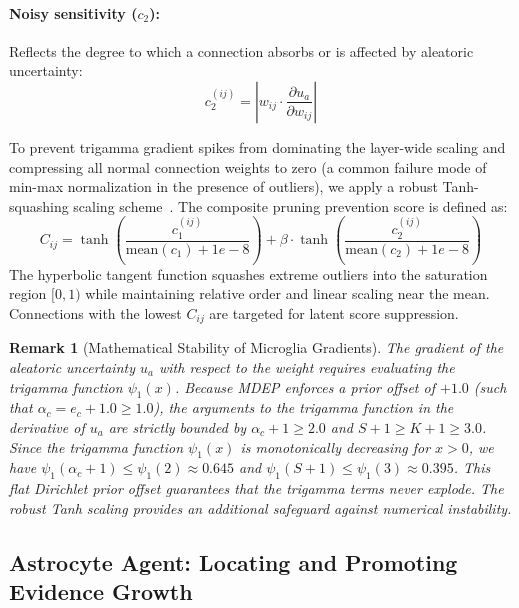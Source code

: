 \documentclass[letterpaper]{article} %
\newtheorem{remark}{Remark}
\begin{document}
\paragraph{Noisy sensitivity ($c_2$):}
Reflects the degree to which a connection absorbs or is affected by aleatoric uncertainty:
\begin{equation}
    c_2^{(ij)} = \left| w_{ij} \cdot \frac{\partial u_a}{\partial w_{ij}} \right|
\end{equation}

To prevent trigamma gradient spikes from dominating the layer-wide scaling and compressing all normal connection weights to zero (a common failure mode of min-max normalization in the presence of outliers), we apply a robust Tanh-squashing scaling scheme~\cite{jain2005score}. The composite pruning prevention score is defined as:
\begin{equation}\label{eq:C_ij}
    C_{ij} = \tanh\!\left(\frac{c_1^{(ij)}}{\text{mean}(c_1) + 1e-8}\right) + \beta \cdot \tanh\!\left(\frac{c_2^{(ij)}}{\text{mean}(c_2) + 1e-8}\right)
\end{equation}
The hyperbolic tangent function squashes extreme outliers into the saturation region $[0, 1)$ while maintaining relative order and linear scaling near the mean. Connections with the lowest $C_{ij}$ are targeted for latent score suppression.

\begin{remark}[Mathematical Stability of Microglia Gradients]
The gradient of the aleatoric uncertainty $u_a$ with respect to the weight requires evaluating the trigamma function $\psi_1(x)$. Because MDEP enforces a prior offset of $+1.0$ (such that $\alpha_c = e_c + 1.0 \ge 1.0$), the arguments to the trigamma function in the derivative of $u_a$ are strictly bounded by $\alpha_c + 1 \ge 2.0$ and $S + 1 \ge K + 1 \ge 3.0$. Since the trigamma function $\psi_1(x)$ is monotonically decreasing for $x > 0$, we have $\psi_1(\alpha_c+1) \le \psi_1(2) \approx 0.645$ and $\psi_1(S+1) \le \psi_1(3) \approx 0.395$. This flat Dirichlet prior offset guarantees that the trigamma terms never explode. The robust Tanh scaling provides an additional safeguard against numerical instability.
\end{remark}

\subsection{Astrocyte Agent: Locating and Promoting Evidence Growth}\label{subsec:astrocyte}
\end{document}
